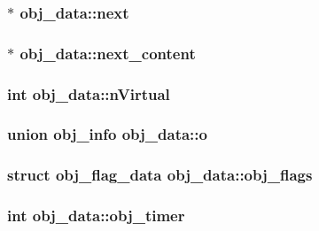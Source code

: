 \hypertarget{structobj__data_a58d99df34e9afce44fc932f1a9c597c7}{
\subsubsection[{next}]{$\ast$ obj\-\_\-data\-::next}}\label{structobj__data_a58d99df34e9afce44fc932f1a9c597c7}
\hypertarget{structobj__data_a5ffcda8d82a9ab6bd7ff8c322f09f6dd}{
\subsubsection[{next\-\_\-content}]{$\ast$ obj\-\_\-data\-::next\-\_\-content}}\label{structobj__data_a5ffcda8d82a9ab6bd7ff8c322f09f6dd}
\hypertarget{structobj__data_a0f86b2c16ca687349eac79f4e5f92180}{
\subsubsection[{n\-Virtual}]{\setlength{\rightskip}{0pt plus 5cm}int obj\-\_\-data\-::n\-Virtual}}\label{structobj__data_a0f86b2c16ca687349eac79f4e5f92180}
\hypertarget{structobj__data_ad9caadfa2dc5e579859ef20d261e673d}{
\subsubsection[{o}]{\setlength{\rightskip}{0pt plus 5cm}union {\bf obj\-\_\-info} obj\-\_\-data\-::o}}\label{structobj__data_ad9caadfa2dc5e579859ef20d261e673d}
\hypertarget{structobj__data_a7bd3e58c91ec7bec7ee0e52f0bb911ec}{
\subsubsection[{obj\-\_\-flags}]{\setlength{\rightskip}{0pt plus 5cm}struct {\bf obj\-\_\-flag\-\_\-data} obj\-\_\-data\-::obj\-\_\-flags}}\label{structobj__data_a7bd3e58c91ec7bec7ee0e52f0bb911ec}
\hypertarget{structobj__data_a12a5ac819702187cb846edb50f2ed87b}{
\subsubsection[{obj\-\_\-timer}]{\setlength{\rightskip}{0pt plus 5cm}int obj\-\_\-data\-::obj\-\_\-timer}}\label{structobj__data_a12a5ac819702187cb846edb50f2ed87b}
